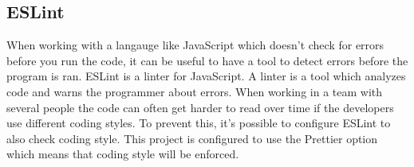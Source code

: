 \subsection{ESLint}
When working with a langauge like JavaScript which doesn't check for errors before you run the code, it can be useful to have a tool to detect errors before the program is ran. ESLint is a linter for JavaScript. A linter is a tool which analyzes code and warns the programmer about errors. When working in a team with several people the code can often get harder to read over time if the developers use different coding styles. To prevent this, it's possible to configure ESLint to also check coding style. This project is configured to use the Prettier option which means that coding style will be enforced. 